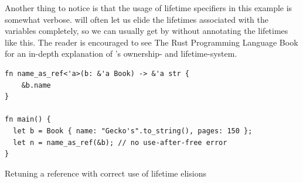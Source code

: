 Another thing to notice is that the usage of lifetime specifiers in this example is somewhat verbose.
{\rust} will often let us elide the lifetimes associated with the variables completely, so we can usually get by without annotating the lifetimes like this.
The reader is encouraged to see The Rust Programming Language Book \cite{web:rust_book} for an in-depth explanation of {\rust}'s ownership- and lifetime-system.

\begin{listing}[tb]
\begin{verbatim}
fn name_as_ref<'a>(b: &'a Book) -> &'a str {
    &b.name
}

fn main() {
  let b = Book { name: "Gecko's".to_string(), pages: 150 };
  let n = name_as_ref(&b); // no use-after-free error
}
\end{verbatim}
\caption{Retuning a reference with correct use of lifetime elisions}
\label{lst:valid_ref_rust}
\end{listing}




